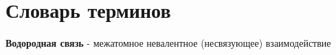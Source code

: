 \chapter*{Словарь терминов}             %

\textbf{Водородная связь} - межатомное невалентное (несвязующее) взаимодействие
